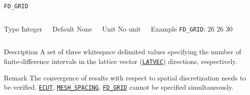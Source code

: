 \documentclass[xcolor=dvipsnames,t]{beamer}
\begin{document}
\begin{frame}[allowframebreaks]{\texttt{FD\_GRID}} \label{FD_GRID}
\vspace*{-12pt}
\begin{columns}
\begin{block}{Type}
Integer
\end{block}

\begin{block}{Default}
None
\end{block}

\begin{block}{Unit}
No unit
\end{block}

\begin{block}{Example}
\texttt{FD\_GRID}: 26 26 30
\end{block}
\end{columns}

\begin{block}{Description}
A set of three whitespace delimited values specifying the number of finite-difference intervals in the lattice vector (\hyperlink{LATVEC}{\texttt{LATVEC}}) directions, respectively.
\end{block}

\begin{block}{Remark}
The convergence of results with respect to spatial discretization needs to be verified. \hyperlink{ECUT}{\texttt{ECUT}}, \hyperlink{MESH_SPACING}{\texttt{MESH\_SPACING}}, \hyperlink{FD_GRID}{\texttt{FD\_GRID}} cannot be specified simultaneously.
\end{block}

\end{frame}
\end{document}

